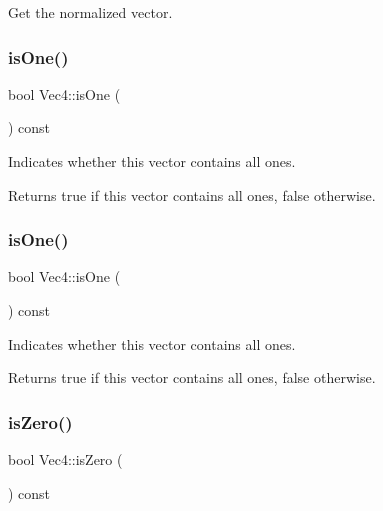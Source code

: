 Get the normalized vector. \mbox{\label{classVec4_aed369ed7241495fa5bf5e7e21a327705}} 
\subsubsection{\texorpdfstring{is\+One()}{isOne()}\hspace{0.1cm}{\footnotesize\ttfamily [1/2]}}
{\footnotesize\ttfamily bool Vec4\+::is\+One (\begin{DoxyParamCaption}{ }\end{DoxyParamCaption}) const}

Indicates whether this vector contains all ones.

\begin{DoxyReturn}{Returns}
true if this vector contains all ones, false otherwise. 
\end{DoxyReturn}
\mbox{\label{classVec4_aed369ed7241495fa5bf5e7e21a327705}} 
\subsubsection{\texorpdfstring{is\+One()}{isOne()}\hspace{0.1cm}{\footnotesize\ttfamily [2/2]}}
{\footnotesize\ttfamily bool Vec4\+::is\+One (\begin{DoxyParamCaption}{ }\end{DoxyParamCaption}) const}

Indicates whether this vector contains all ones.

\begin{DoxyReturn}{Returns}
true if this vector contains all ones, false otherwise. 
\end{DoxyReturn}
\mbox{\label{classVec4_a4736299b9772b67d32f3ca2ef45f39ad}} 
\subsubsection{\texorpdfstring{is\+Zero()}{isZero()}\hspace{0.1cm}{\footnotesize\ttfamily [1/2]}}
{\footnotesize\ttfamily bool Vec4\+::is\+Zero (\begin{DoxyParamCaption}{ }\end{DoxyParamCaption}) const}

